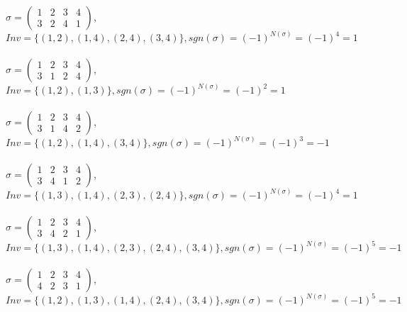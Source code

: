 \documentclass[12pt, a4paper]{article}
\begin{document}
\\
\noindent
$\sigma =\left(\begin{array}{cccc} 1 & 2 & 3 & 4\\ 3 & 2 & 4 & 1 \end{array}\right)$,\\  $Inv = \{(1, 2), (1, 4), (2, 4), (3, 4)\}, sgn(\sigma) = (-1)^{N(\sigma)} = (-1)^4 = 1$\\
\\
\noindent
$\sigma =\left(\begin{array}{cccc} 1 & 2 & 3 & 4\\ 3 & 1 & 2 & 4 \end{array}\right)$,\\  $Inv = \{(1, 2), (1, 3)\}, sgn(\sigma) = (-1)^{N(\sigma)} = (-1)^2 = 1$\\
\\
\noindent
$\sigma =\left(\begin{array}{cccc} 1 & 2 & 3 & 4\\ 3 & 1 & 4 & 2 \end{array}\right)$,\\  $Inv = \{(1, 2), (1, 4), (3, 4)\}, sgn(\sigma) = (-1)^{N(\sigma)} = (-1)^3 = -1$\\
\\
\noindent
$\sigma =\left(\begin{array}{cccc} 1 & 2 & 3 & 4\\ 3 & 4 & 1 & 2 \end{array}\right)$,\\  $Inv = \{(1, 3), (1, 4), (2, 3), (2, 4)\}, sgn(\sigma) = (-1)^{N(\sigma)} = (-1)^4 = 1$\\
\\
\noindent
$\sigma =\left(\begin{array}{cccc} 1 & 2 & 3 & 4\\ 3 & 4 & 2 & 1 \end{array}\right)$,\\  $Inv = \{(1, 3), (1, 4), (2, 3), (2, 4), (3, 4)\}, sgn(\sigma) = (-1)^{N(\sigma)} = (-1)^5 = -1$\\
\\
\noindent
$\sigma =\left(\begin{array}{cccc} 1 & 2 & 3 & 4\\ 4 & 2 & 3 & 1 \end{array}\right)$,\\  $Inv = \{(1, 2), (1, 3), (1, 4), (2, 4), (3, 4)\}, sgn(\sigma) = (-1)^{N(\sigma)} = (-1)^5 = -1$\\
\\
\end{document}
